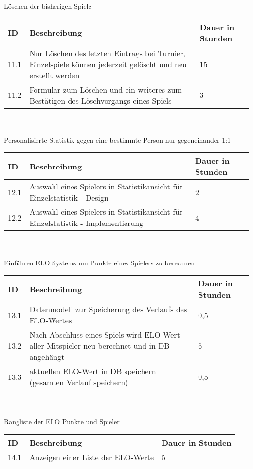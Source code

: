 Löschen der bisherigen Spiele\\
\begin{tabular}[h]{|p{1cm}|p{10cm}|p{3cm}|}
\hline 
ID & Beschreibung & Dauer in Stunden \\ \hline
11.1 & Nur Löschen des letzten Eintrags bei Turnier, Einzelspiele können jederzeit gelöscht und neu erstellt werden & 15 \\ \hline
11.2 & Formular zum Löschen und ein weiteres zum Bestätigen des Löschvorgangs eines Spiels & 3 \\ \hline
\end{tabular}\\ \\
Personalisierte Statistik gegen eine bestimmte Person nur gegeneinander 1:1\\
\begin{tabular}[h]{|p{1cm}|p{10cm}|p{3cm}|}
\hline 
ID & Beschreibung & Dauer in Stunden \\ \hline
12.1 & Auswahl eines Spielers in Statistikansicht für Einzelstatistik - Design & 2 \\ \hline	
12.2 & Auswahl eines Spielers in Statistikansicht für Einzelstatistik - Implementierung & 4 \\ \hline
\end{tabular}\\ \\
Einführen ELO Systems um Punkte eines Spielers zu berechnen\\
\begin{tabular}[h]{|p{1cm}|p{10cm}|p{3cm}|}
\hline 
ID & Beschreibung & Dauer in Stunden \\ \hline
13.1 & Datenmodell zur Speicherung des Verlaufs des ELO-Wertes & 0,5 \\ \hline	
13.2 & Nach Abschluss eines Spiels wird ELO-Wert aller Mitspieler neu berechnet und in DB angehängt & 6	\\ \hline
13.3 & aktuellen ELO-Wert in DB speichern (gesamten Verlauf speichern) & 0,5 \\ \hline	
\end{tabular}\\ \\
Rangliste der ELO Punkte und Spieler\\
\begin{tabular}[h]{|p{1cm}|p{10cm}|p{3cm}|}
\hline 
ID & Beschreibung & Dauer in Stunden \\ \hline
14.1 & Anzeigen einer Liste der ELO-Werte & 5 \\ \hline
\end{tabular}\newpage
